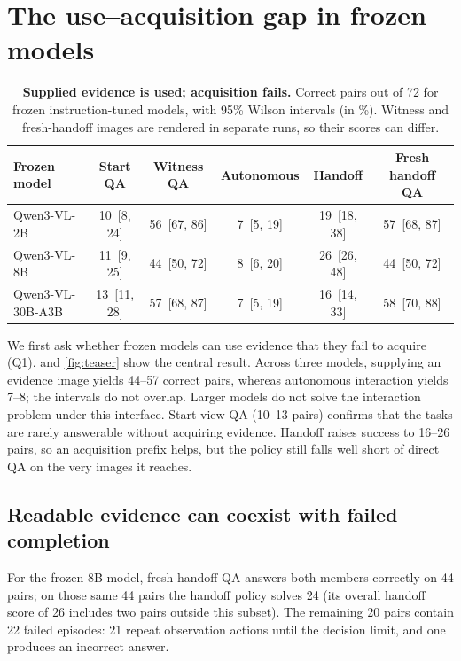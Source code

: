 \documentclass{article}
\begin{document}
\section{The use--acquisition gap in frozen models}
\label{sec:gap}

\begin{table}[t]
\centering
\caption{\textbf{Supplied evidence is used; acquisition fails.} Correct pairs out of 72 for frozen instruction-tuned models, with 95\% Wilson intervals (in \%). Witness and fresh-handoff images are rendered in separate runs, so their scores can differ.}
\label{tab:frozen}
\small
\begin{tabular}{lccccc}
\toprule
Frozen model & Start QA & Witness QA & Autonomous & Handoff & Fresh handoff QA \\
\midrule
Qwen3-VL-2B & 10 \,{\scriptsize[8, 24]} & 56 \,{\scriptsize[67, 86]} & 7 \,{\scriptsize[5, 19]} & 19 \,{\scriptsize[18, 38]} & 57 \,{\scriptsize[68, 87]} \\
Qwen3-VL-8B & 11 \,{\scriptsize[9, 25]} & 44 \,{\scriptsize[50, 72]} & 8 \,{\scriptsize[6, 20]} & 26 \,{\scriptsize[26, 48]} & 44 \,{\scriptsize[50, 72]} \\
Qwen3-VL-30B-A3B & 13 \,{\scriptsize[11, 28]} & 57 \,{\scriptsize[68, 87]} & 7 \,{\scriptsize[5, 19]} & 16 \,{\scriptsize[14, 33]} & 58 \,{\scriptsize[70, 88]} \\
\bottomrule
\end{tabular}
\end{table}

We first ask whether frozen models can use evidence that they fail to acquire (Q1).  and \cref{fig:teaser} show the central result. Across three models, supplying an evidence image yields 44--57 correct pairs, whereas autonomous interaction yields 7--8; the intervals do not overlap. Larger models do not solve the interaction problem under this interface. Start-view QA (10--13 pairs) confirms that the tasks are rarely answerable without acquiring evidence. Handoff raises success to 16--26 pairs, so an acquisition prefix helps, but the policy still falls well short of direct QA on the very images it reaches.

\subsection{Readable evidence can coexist with failed completion}
For the frozen 8B model, fresh handoff QA answers both members correctly on 44 pairs; on those same 44 pairs the handoff policy solves 24 (its overall handoff score of 26 includes two pairs outside this subset). The remaining 20 pairs contain 22 failed episodes: 21 repeat observation actions until the decision limit, and one produces an incorrect answer.
\end{document}
